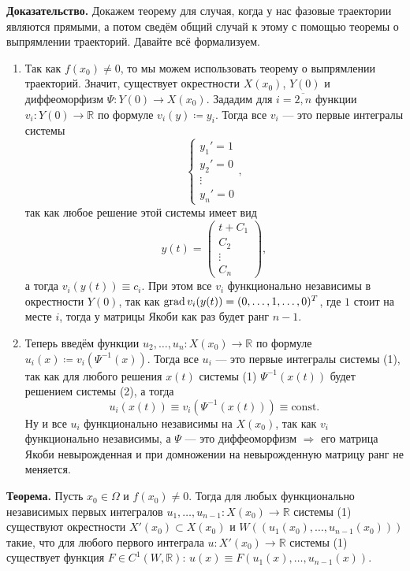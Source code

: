 \textbf{Доказательство.} Докажем теорему для случая, когда у нас фазовые траектории являются прямыми, а потом сведём общий случай к этому с помощью теоремы о выпрямлении траекторий. Давайте всё формализуем.
\begin{enumerate}
    \item Так как $f(x_0) \ne 0$, то мы можем использовать теорему о выпрямлении траекторий. Значит, существует окрестности $X(x_0)$, $Y(0)$ и диффеоморфизм $\Psi\colon Y(0) \to X(x_0)$. Зададим для $i=\overline{2, n}$ функции $v_i\colon Y(0) \to \mathbb{R}$ по формуле $v_i(y) \coloneq y_i$.
    Тогда все $v_i$ --- это первые интегралы системы
    \begin{equation}
        \begin{cases}
            y_1' = 1\\
            y_2' = 0\\
            \vdots\\
            y_n' = 0
        \end{cases},
    \end{equation}
    так как любое решение этой системы имеет вид
    \[
        y(t) = \begin{pmatrix}
            t+C_1\\
            C_2\\
            \vdots\\
            C_n
        \end{pmatrix},
    \]
    а тогда $v_i(y(t)) \equiv c_i$. При этом все $v_i$ функционально независимы в окрестности $Y(0)$, так как $\operatorname{grad} v_i(y(t)) = (0, \dots, 1, \dots, 0)^T$, где $1$ стоит на месте $i$, тогда у матрицы Якоби как раз будет ранг $n-1$.
    \item Теперь введём функции $u_2, \dots, u_n\colon X(x_0) \to \mathbb{R}$ по формуле $u_i(x) \coloneq v_i(\Psi^{-1}(x))$. Тогда все $u_i$ --- это первые интегралы системы (1), так как для любого решения $x(t)$ системы (1) $\Psi^{-1}(x(t))$ будет решением системы (2), а тогда
    \[
        u_i(x(t)) \equiv v_i(\Psi^{-1}(x(t))) \equiv \text{const}.
    \]
    Ну и все $u_i$ функционально независимы на $X(x_0)$, так как $v_i$ функционально независимы, а $\Psi$ --- это диффеоморфизм $\Rightarrow$ его матрица Якоби невырожденная и при домножении на невырожденную матрицу ранг не меняется.

    \QED
\end{enumerate}


\textbf{Теорема.} Пусть $x_0 \in \Omega$ и $f(x_0) \ne 0$. Тогда для любых функционально независимых первых интегралов $u_1, \dots, u_{n-1}\colon X(x_0) \to \mathbb{R}$ системы (1) существуют окрестности $X'(x_0) \subset X(x_0)$ и $W((u_1(x_0), \dots, u_{n-1}(x_0)))$ такие, что
для любого первого интеграла $u\colon X'(x_0) \to \mathbb{R}$ системы (1) существует функция $F \in C^1(W, \mathbb{R})$: $u(x) \equiv F(u_1(x), \dots, u_{n-1}(x))$.

